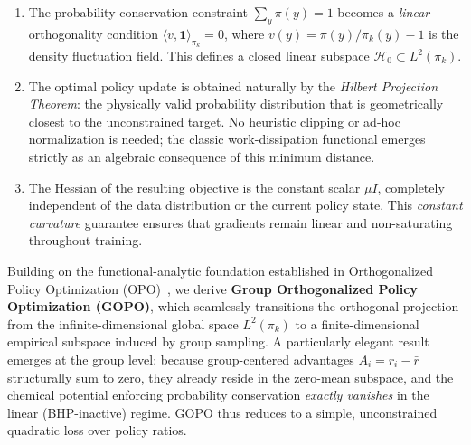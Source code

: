 \documentclass[11pt]{article}
\theoremstyle{definition}
\theoremstyle{remark}
\newcommand{\pik}{\pi_k}
\begin{document}
\begin{enumerate}[leftmargin=2em]
    \item The probability conservation constraint $\sum_y \pi(y) = 1$ becomes a \emph{linear} orthogonality condition $\langle v, \mathbf{1}\rangle_{\pik} = 0$, where $v(y) = \pi(y)/\pik(y) - 1$ is the density fluctuation field. This defines a closed linear subspace $\mathcal{H}_0 \subset L^2(\pik)$.
    \item The optimal policy update is obtained naturally by the \emph{Hilbert Projection Theorem}: the physically valid probability distribution that is geometrically closest to the unconstrained target. No heuristic clipping or ad-hoc normalization is needed; the classic work-dissipation functional emerges strictly as an algebraic consequence of this minimum distance.
    \item The Hessian of the resulting objective is the constant scalar $\mu I$, completely independent of the data distribution or the current policy state. This \emph{constant curvature} guarantee ensures that gradients remain linear and non-saturating throughout training.
\end{enumerate}

Building on the functional-analytic foundation established in Orthogonalized Policy Optimization (OPO)~\cite{Wang2025OPO}, we derive \textbf{Group Orthogonalized Policy Optimization (GOPO)}, which seamlessly transitions the orthogonal projection from the infinite-dimensional global space $L^2(\pik)$ to a finite-dimensional empirical subspace induced by group sampling. A particularly elegant result emerges at the group level: because group-centered advantages $A_i = r_i - \bar{r}$ structurally sum to zero, they already reside in the zero-mean subspace, and the chemical potential enforcing probability conservation \emph{exactly vanishes} in the linear (BHP-inactive) regime. GOPO thus reduces to a simple, unconstrained quadratic loss over policy ratios.
\end{document}
